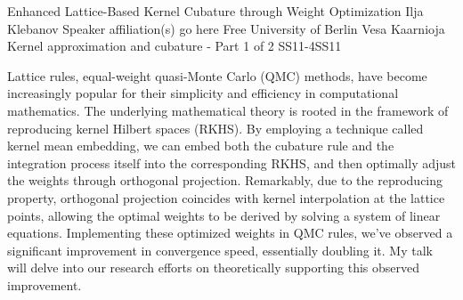 \begin{talk}
  {Enhanced Lattice-Based Kernel Cubature through Weight Optimization}%
  {Ilja Klebanov}%
  {Speaker affiliation(s) go here}%
  {Free University of Berlin}%
  {Vesa Kaarnioja}%
{Kernel approximation and cubature - Part 1 of 2}
{}{SS11-4}{SS11}

			
Lattice rules, equal-weight quasi-Monte Carlo (QMC) methods, have become increasingly popular for their simplicity and efficiency in computational mathematics. The underlying mathematical theory is rooted in the framework of reproducing kernel Hilbert spaces (RKHS). By employing a technique called kernel mean embedding, we can embed both the cubature rule and the integration process itself into the corresponding RKHS, and then optimally adjust the weights through orthogonal projection. Remarkably, due to the reproducing property, orthogonal projection coincides with kernel interpolation at the lattice points, allowing the optimal weights to be derived by solving a system of linear equations. Implementing these optimized weights in QMC rules, we've observed a significant improvement in convergence speed, essentially doubling it. My talk will delve into our research efforts on theoretically supporting this observed improvement.
\end{talk}

